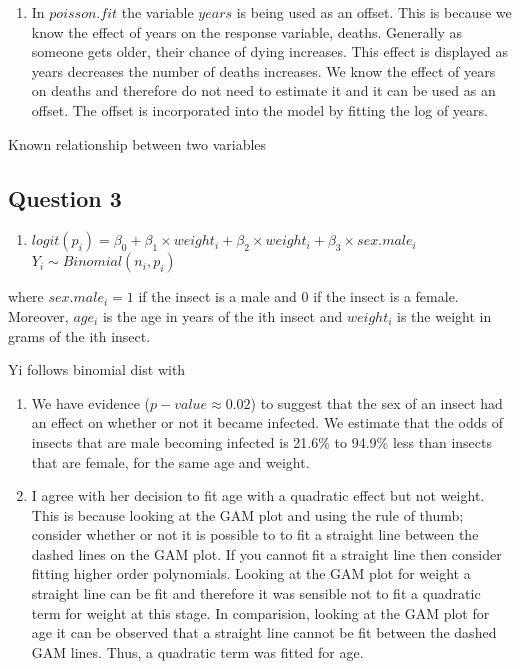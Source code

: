 \documentclass[
]{article}
\providecommand{\tightlist}{%
  \setlength{\itemsep}{0pt}\setlength{\parskip}{0pt}}
\begin{document}
\begin{enumerate}
\def\labelenumi{\alph{enumi})}
\setcounter{enumi}{2}
\tightlist
\item
  In \(poisson.fit\) the variable \(years\) is being used as an offset.
  This is because we know the effect of years on the response variable,
  deaths. Generally as someone gets older, their chance of dying
  increases. This effect is displayed as years decreases the number of
  deaths increases. We know the effect of years on deaths and therefore
  do not need to estimate it and it can be used as an offset. The offset
  is incorporated into the model by fitting the log of years.
\end{enumerate}

Known relationship between two variables

\hypertarget{question-3}{%
\subsection{Question 3}\label{question-3}}

\begin{enumerate}
\def\labelenumi{\alph{enumi})}
\tightlist
\item
  \(logit(p_i) = \beta_0 + \beta_1 \times weight_i + \beta_2 \times weight_i + \beta_3 \times sex.male_i\)
  \(Y_i \sim Binomial(n_i, p_i)\)
\end{enumerate}

where \(sex.male_i = 1\) if the insect is a male and \(0\) if the insect
is a female. Moreover, \(age_i\) is the age in years of the ith insect
and \(weight_i\) is the weight in grams of the ith insect.

Yi follows binomial dist with

\begin{enumerate}
\def\labelenumi{\alph{enumi})}
\setcounter{enumi}{1}
\item
  We have evidence (\(p-value \approx 0.02\)) to suggest that the sex of
  an insect had an effect on whether or not it became infected. We
  estimate that the odds of insects that are male becoming infected is
  21.6\% to 94.9\% less than insects that are female, for the same age
  and weight.
\item
  I agree with her decision to fit age with a quadratic effect but not
  weight. This is because looking at the GAM plot and using the rule of
  thumb; consider whether or not it is possible to to fit a straight
  line between the dashed lines on the GAM plot. If you cannot fit a
  straight line then consider fitting higher order polynomials. Looking
  at the GAM plot for weight a straight line can be fit and therefore it
  was sensible not to fit a quadratic term for weight at this stage. In
  comparision, looking at the GAM plot for age it can be observed that a
  straight line cannot be fit between the dashed GAM lines. Thus, a
  quadratic term was fitted for age.
\end{enumerate}
\end{document}
